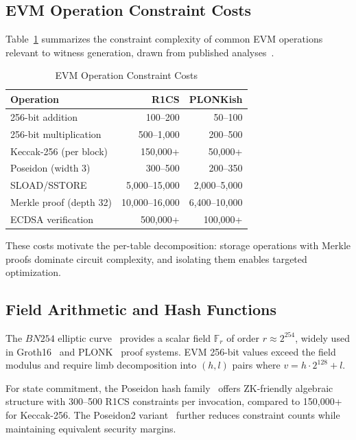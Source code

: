 \documentclass[conference]{IEEEtran}
\newcommand{\Fr}{\mathbb{F}_r}
\newcommand{\bn}{BN254}
\begin{document}
\subsection{EVM Operation Constraint Costs}

Table~\ref{tab:constraint-costs} summarizes the constraint complexity
of common EVM operations relevant to witness generation, drawn from
published analyses~\cite{constraint-survey-2025, ethsnarks-2019}.

\begin{table}[htbp]
\caption{EVM Operation Constraint Costs}
\label{tab:constraint-costs}
\centering
\begin{tabular}{lrr}
\toprule
\textbf{Operation} & \textbf{R1CS} & \textbf{PLONKish} \\
\midrule
256-bit addition     & 100--200    & 50--100   \\
256-bit multiplication & 500--1{,}000 & 200--500 \\
Keccak-256 (per block) & 150{,}000+  & 50{,}000+ \\
Poseidon (width 3)   & 300--500    & 200--350  \\
SLOAD/SSTORE         & 5{,}000--15{,}000 & 2{,}000--5{,}000 \\
Merkle proof (depth 32) & 10{,}000--16{,}000 & 6{,}400--10{,}000 \\
ECDSA verification   & 500{,}000+  & 100{,}000+ \\
\bottomrule
\end{tabular}
\end{table}

These costs motivate the per-table decomposition: storage operations
with Merkle proofs dominate circuit complexity, and isolating them
enables targeted optimization.

\subsection{Field Arithmetic and Hash Functions}

The $\bn{}$ elliptic curve~\cite{bn254-2010} provides a scalar field
$\Fr$ of order $r \approx 2^{254}$, widely used in Groth16~\cite{groth16}
and PLONK~\cite{plonk-2019} proof systems. EVM 256-bit values exceed
the field modulus and require limb decomposition into $(h, l)$ pairs
where $v = h \cdot 2^{128} + l$.

For state commitment, the Poseidon hash family~\cite{poseidon-2021}
offers ZK-friendly algebraic structure with 300--500 R1CS constraints
per invocation, compared to 150{,}000+ for Keccak-256. The Poseidon2
variant~\cite{poseidon2-2023} further reduces constraint counts while
maintaining equivalent security margins.
\end{document}
